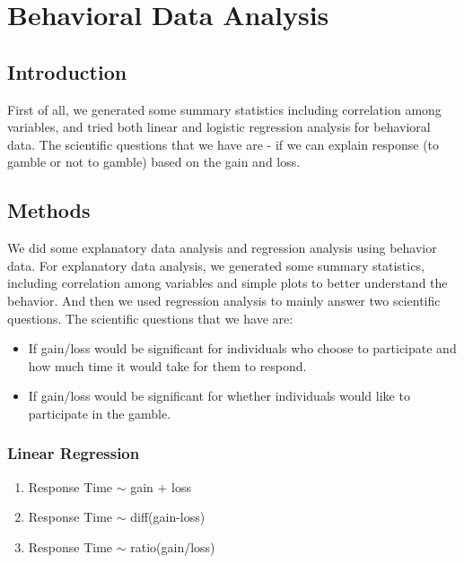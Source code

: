 \section{Behavioral Data Analysis}

\subsection{Introduction}
\noindent
First of all, we generated some summary statistics including correlation among variables, 
and tried both linear and logistic regression analysis for behavioral data. The scientific 
questions that we have are - if we can explain response (to gamble or not 
to gamble) based on the gain and loss.

\subsection{Methods}
\noindent
We did some explanatory data analysis and regression analysis using behavior 
data. For explanatory data analysis, we generated some summary statistics, 
including correlation among variables and simple plots to better understand 
the behavior. And then we used regression analysis to mainly answer two 
scientific questions. The scientific questions that we have are:
\begin{itemize}
\item If gain/loss would be significant for individuals who choose to 
participate and how much time it would take for them to respond.
\item If gain/loss would be significant for whether individuals would like to 
participate in the gamble. 
\end {itemize}

\subsubsection {Linear Regression}
\begin{enumerate}
\item  Response Time $\sim$ gain + loss
\item  Response Time $\sim$ diff(gain-loss)
\item  Response Time $\sim$ ratio(gain/loss)
\end {enumerate}

